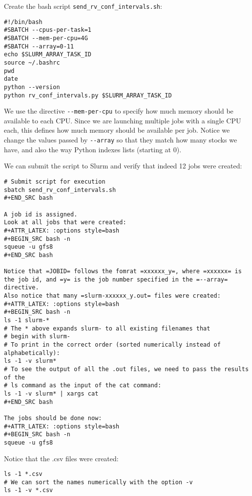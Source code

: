 \documentclass[12pt, a4paper]{article}
\begin{document}
Create the bash script \texttt{send\_rv\_conf\_intervals.sh}:
\lstset{language=bash,label= ,caption= ,captionpos=b,firstnumber=1,numbers=left,style=bash}
\begin{lstlisting}
#!/bin/bash
#SBATCH --cpus-per-task=1
#SBATCH --mem-per-cpu=4G
#SBATCH --array=0-11
echo $SLURM_ARRAY_TASK_ID
source ~/.bashrc
pwd
date
python --version
python rv_conf_intervals.py $SLURM_ARRAY_TASK_ID
\end{lstlisting}
We use the directive \texttt{-{}-mem-per-cpu} to specify how much memory should be available to each CPU.
Since we are launching multiple jobs with a single CPU each, this defines how much memory should be available per job.
Notice we change the values passed by \texttt{-{}-array} so that they match how many stocks we have, and also the way Python indexes lists (starting at 0).

We can submit the script to Slurm and verify that indeed 12 jobs were created:
\lstset{language=bash,label= ,caption= ,captionpos=b,firstnumber=1,numbers=left,style=bash}
\begin{lstlisting}
# Submit script for execution
sbatch send_rv_conf_intervals.sh
#+END_SRC bash

A job id is assigned.
Look at all jobs that were created:
#+ATTR_LATEX: :options style=bash
#+BEGIN_SRC bash -n
squeue -u gfs8
#+END_SRC bash

Notice that =JOBID= follows the fomrat =xxxxxx_y=, where =xxxxxx= is the job id, and =y= is the job number specified in the =--array= directive.
Also notice that many =slurm-xxxxxx_y.out= files were created:
#+ATTR_LATEX: :options style=bash
#+BEGIN_SRC bash -n
ls -1 slurm-*
# The * above expands slurm- to all existing filenames that
# begin with slurm-
# To print in the correct order (sorted numerically instead of alphabetically):
ls -1 -v slurm*
# To see the output of all the .out files, we need to pass the results of the
# ls command as the input of the cat command:
ls -1 -v slurm* | xargs cat
#+END_SRC bash

The jobs should be done now:
#+ATTR_LATEX: :options style=bash
#+BEGIN_SRC bash -n
squeue -u gfs8
\end{lstlisting}

Notice that the .csv files were created:
\lstset{language=bash,label= ,caption= ,captionpos=b,firstnumber=1,numbers=left,style=bash}
\begin{lstlisting}
ls -1 *.csv
# We can sort the names numerically with the option -v
ls -1 -v *.csv
\end{lstlisting}
\end{document}
